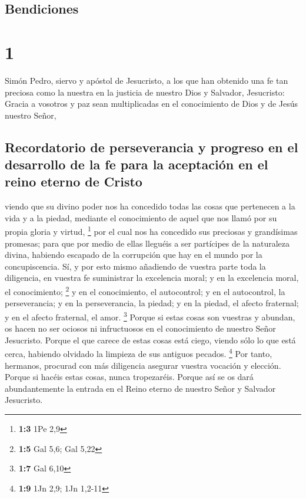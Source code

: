 \hypertarget{bendiciones}{%
\subsection{Bendiciones}\label{bendiciones}}

\hypertarget{section}{%
\section{1}\label{section}}

 Simón Pedro, siervo y apóstol de Jesucristo, a los que
han obtenido una fe tan preciosa como la nuestra en la justicia de
nuestro Dios y Salvador, Jesucristo:  Gracia a vosotros y
paz sean multiplicadas en el conocimiento de Dios y de Jesús nuestro
Señor,

\hypertarget{recordatorio-de-perseverancia-y-progreso-en-el-desarrollo-de-la-fe-para-la-aceptaciuxf3n-en-el-reino-eterno-de-cristo}{%
\subsection{Recordatorio de perseverancia y progreso en el desarrollo de
la fe para la aceptación en el reino eterno de
Cristo}\label{recordatorio-de-perseverancia-y-progreso-en-el-desarrollo-de-la-fe-para-la-aceptaciuxf3n-en-el-reino-eterno-de-cristo}}

 viendo que su divino poder nos ha concedido todas las
cosas que pertenecen a la vida y a la piedad, mediante el conocimiento
de aquel que nos llamó por su propia gloria y virtud, \footnote{\textbf{1:3}
  1Pe 2,9}  por el cual nos ha concedido sus preciosas y
grandísimas promesas; para que por medio de ellas lleguéis a ser
partícipes de la naturaleza divina, habiendo escapado de la corrupción
que hay en el mundo por la concupiscencia.  Sí, y por esto
mismo añadiendo de vuestra parte toda la diligencia, en vuestra fe
suministrar la excelencia moral; y en la excelencia moral, el
conocimiento; \footnote{\textbf{1:5} Gal 5,6; Gal 5,22}  y
en el conocimiento, el autocontrol; y en el autocontrol, la
perseverancia; y en la perseverancia, la piedad;  y en la
piedad, el afecto fraternal; y en el afecto fraternal, el amor.
\footnote{\textbf{1:7} Gal 6,10}  Porque si estas cosas
son vuestras y abundan, os hacen no ser ociosos ni infructuosos en el
conocimiento de nuestro Señor Jesucristo.  Porque el que
carece de estas cosas está ciego, viendo sólo lo que está cerca,
habiendo olvidado la limpieza de sus antiguos pecados. \footnote{\textbf{1:9}
  1Jn 2,9; 1Jn 1,2-11}  Por tanto, hermanos, procurad con
más diligencia asegurar vuestra vocación y elección. Porque si hacéis
estas cosas, nunca tropezaréis.  Porque así se os dará
abundantemente la entrada en el Reino eterno de nuestro Señor y Salvador
Jesucristo.

